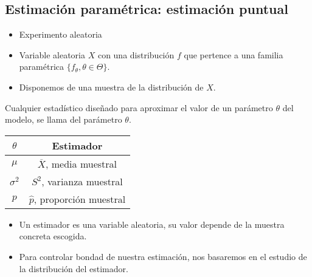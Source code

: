 \subsection{Estimación paramétrica: estimación puntual}
\begin{tcolorbox}[colback=blue!5!white, colframe=blue!75!black, title=\textbf{Ingredientes del modelo}]
\begin{itemize}[label=\textbullet]
    \item Experimento aleatoria
    \item Variable aleatoria $X$ con una distribución $f$ que pertence a una familia paramétrica $\{f_\theta,\theta \in \Theta\} $.
    \item Disponemos de una muestra de la distribución de $X$.
\end{itemize}
\end{tcolorbox}
\begin{tcolorbox}[colback=blue!5!white, colframe=blue!75!black, title=\textbf{Definición}]
Cualquier estadístico diseñado para aproximar el valor de un parámetro $\theta$ del modelo, se llama  del parámetro $\theta$.
\end{tcolorbox}
\begin{tcolorbox}[colback=blue!5!white, colframe=blue!75!black, title=\textbf{Ejemplos de estimadores paramétricos}]
\begin{center}
    \begin{tabular}{cc}
        $\theta$ & \textbf{Estimador}\\ \hline
        $\mu$ & $\overline{X}$, media muestral\\ \hline
        $\sigma^2$ & $S^2$, varianza muestral\\ \hline
        $p$ & $\hat{p}$, proporción muestral
    \end{tabular}
\end{center}
\end{tcolorbox}
\begin{tcolorbox}[colback=olive!5!white, colframe=olive!75!black, title=\textbf{A tener en cuenta:}]
\begin{itemize}[label=\textbullet]
    \item Un estimador es una variable aleatoria, su valor depende de la muestra concreta escogida.
    \item Para controlar bondad de nuestra estimación, nos basaremos en el estudio de la distribución del estimador.
\end{itemize}
\end{tcolorbox}
